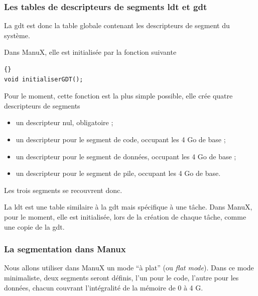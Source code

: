 \subsubsection{Les tables de descripteurs de segments {\sc ldt} et {\sc gdt}}

   La {\sc gdt} est donc la table globale contenant les descripteurs
de segment du système.

   Dans ManuX, elle est initialisée par la fonction suivante

\begin{lstlisting}{}
void initialiserGDT();     
\end{lstlisting}

   Pour le moment, cette fonction est la plus simple possible, elle
crée quatre descripteurs de segments

\begin{itemize}
   \item un descripteur nul, obligatoire ;
   \item un descripteur pour le segment de code, occupant les 4 Go de base ;
   \item un descripteur pour le segment de données, occupant les 4 Go de base ;
   \item un descripteur pour le segment de pile, occupant les 4 Go de base.
\end{itemize}

   Les trois segments se recouvrent donc.

   La {\sc ldt} est une table similaire à la {\sc gdt} mais spécifique
à une tâche. Dans ManuX, pour le moment, elle est initialisée, lors de
la création de chaque tâche, comme une copie de la {\sc gdt}.

\subsubsection{La segmentation dans Manux}

   Nous allons utiliser dans ManuX un mode ``à plat'' (ou {\em flat
mode}). Dans ce mode minimaliste, deux segments seront définis, l'un
pour le code, l'autre pour les données, chacun couvrant l'intégralité
de la mémoire de 0 à 4 G.


